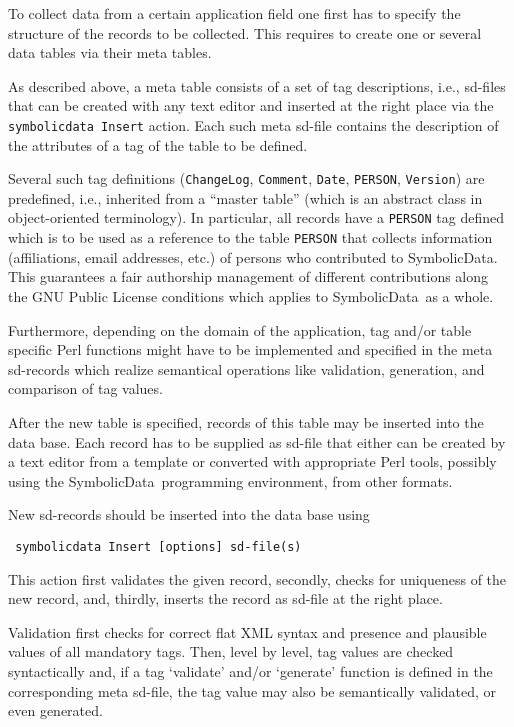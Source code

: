 \documentclass[11pt,a4paper]{article}
\newcommand{\SD}{{\sc Symbolic\-Data}}
\begin{document}
To collect data from a certain application field one first has to
specify the structure of the records to be collected. This requires to
create one or several data tables via their meta tables.

As described above, a meta table consists of a set of tag
descriptions, i.e., sd-files that can be created with any text editor
and inserted at the right place via the {\tt symbolicdata Insert}
action.  Each such meta sd-file contains the description of the
attributes of a tag of the table to be defined.

Several such tag definitions ({\tt ChangeLog}, {\tt Comment}, {\tt Date},
{\tt PERSON}, {\tt Version}) are predefined, i.e., inherited from a
``master table'' (which is an abstract class in object-oriented
terminology). In particular, all records have a {\tt PERSON} tag defined
which is to be used as a reference to the table {\tt PERSON} that collects
information (affiliations, email addresses, etc.) of persons who
contributed to \SD. This guarantees a fair authorship management of
different contributions along the GNU Public License conditions which
applies to \SD\ as a whole.

Furthermore, depending on the domain of the application, tag and/or
table specific Perl functions might have to be implemented and
specified in the meta sd-records which realize semantical operations
like validation, generation, and comparison of tag values.

After the new table is specified, records of this table may be
inserted into the data base. Each record has to be supplied as sd-file
that either can be created by a text editor from a template or
converted with appropriate Perl tools, possibly using the \SD\ 
programming environment, from other formats.

New sd-records should be inserted into the data base using
\begin{verbatim}
 symbolicdata Insert [options] sd-file(s)
\end{verbatim}
This action first validates the given record, secondly, checks for
uniqueness of the new record, and, thirdly, inserts the record as
sd-file at the right place.

Validation first checks for correct flat XML syntax and presence and
plausible values of all mandatory tags. Then, level by level, tag
values are checked syntactically and, if a tag `validate' and/or
`generate' function is defined in the corresponding meta sd-file, the
tag value may also be semantically validated, or even generated.
\end{document}
